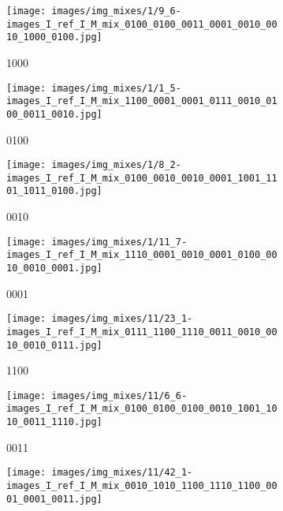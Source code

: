 \begin{figure}[h!]
     \centering
     \begin{subfigure}[b]{0.23\textwidth}
         \centering
         \texttt{[image: images/img\_mixes/1/9\_6-images\_I\_ref\_I\_M\_mix\_0100\_0100\_0011\_0001\_0010\_0010\_1000\_0100.jpg]}
         \caption{1000}
         \label{fig:quad_repl_ex_1_1}
     \end{subfigure}  
     \hfill
     \begin{subfigure}[b]{0.23\textwidth}
         \centering
         \texttt{[image: images/img\_mixes/1/1\_5-images\_I\_ref\_I\_M\_mix\_1100\_0001\_0001\_0111\_0010\_0100\_0011\_0010.jpg]}
         \caption{0100}
         \label{fig:quad_repl_ex_1_2}
     \end{subfigure}
     \hfill
     \begin{subfigure}[b]{0.23\textwidth}
         \centering
         \texttt{[image: images/img\_mixes/1/8\_2-images\_I\_ref\_I\_M\_mix\_0100\_0010\_0010\_0001\_1001\_1101\_1011\_0100.jpg]}
         \caption{0010}
         \label{fig:quad_repl_ex_1_3}
     \end{subfigure}
     \hfill
     \begin{subfigure}[b]{0.23\textwidth}
         \centering
         \texttt{[image: images/img\_mixes/1/11\_7-images\_I\_ref\_I\_M\_mix\_1110\_0001\_0010\_0001\_0100\_0010\_0010\_0001.jpg]}
         \caption{0001}
         \label{fig:quad_repl_ex_1_4}
     \end{subfigure}
     \hfill
     \begin{subfigure}[b]{0.23\textwidth}
         \centering
         \texttt{[image: images/img\_mixes/11/23\_1-images\_I\_ref\_I\_M\_mix\_0111\_1100\_1110\_0011\_0010\_0010\_0010\_0111.jpg]}
         \caption{1100}
         \label{fig:quad_repl_ex_2_1}
     \end{subfigure}
     \hfill     
     \begin{subfigure}[b]{0.23\textwidth}
         \centering
         \texttt{[image: images/img\_mixes/11/6\_6-images\_I\_ref\_I\_M\_mix\_0100\_0100\_0100\_0010\_1001\_1010\_0011\_1110.jpg]}
         \caption{0011}
         \label{fig:quad_repl_ex_2_2}
     \end{subfigure}
     \hfill
     \begin{subfigure}[b]{0.23\textwidth}
         \centering
         \texttt{[image: images/img\_mixes/11/42\_1-images\_I\_ref\_I\_M\_mix\_0010\_1010\_1100\_1110\_1100\_0001\_0001\_0011.jpg]}

\end{subfigure}
\end{figure}
